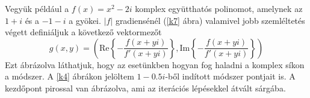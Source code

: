 \documentclass[a4paper,12pt]{report}
\begin{document}
            Vegyük például a $f(x)=x^2-2i$ komplex együtthatós polinomot, amelynek az $1+i$ és a $-1-i$ a gyökei. $|f|$ gradiensénél (\ref{k7} ábra) valamivel jobb szemléltetés végett definiáljuk a következő vektormezőt
			\[g(x,y)=\left(\mathrm{Re} \left\{ -\frac{f(x+yi)}{f'(x+yi)} \right \} ,\mathrm{Im} \left\{-\frac{f(x+yi)}{f'(x+yi)}\right \} \right)\]
            Ezt ábrázolva láthatjuk, hogy az esetünkben hogyan fog haladni a komplex síkon a módszer. A \ref{k4} ábrákon jelöltem $1-0.5i$-ből indított módszer pontjait is. A kezdőpont pirossal van ábrázolva, ami az iterációs lépésekkel átvált sárgába.
			\begin{figure}[htp!]
                \hfill

\end{figure}
\end{document}
